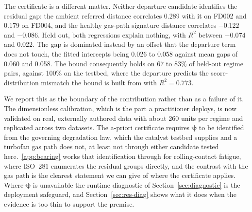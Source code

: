 The certificate is a different matter. Neither departure candidate identifies the residual gap: the
ambient referred distance correlates 0.289 with it on FD002 and 0.179 on FD004, and the healthy
gas-path signature distance correlates $-0.122$ and $-0.086$. Held out, both regressions explain
nothing, with $R^2$ between $-0.074$ and 0.022. The gap is dominated instead by an offset that the
departure term does not touch, the fitted intercepts being 0.026 to 0.058 against mean gaps of 0.060
and 0.058. The bound consequently holds on 67 to 83\% of held-out regime pairs, against 100\% on the
testbed, where the departure predicts the score-distribution mismatch the bound is built from with
$R^2=0.773$.

We report this as the boundary of the contribution rather than as a failure of it. The dimensionless
calibration, which is the part a practitioner deploys, is now validated on real, externally authored
data with about 260 units per regime and replicated across two datasets. The a-priori certificate
requires $\boldsymbol\psi$ to be identified from the governing degradation law, which the catalyst
testbed supplies and a turbofan gas path does not, at least not through either candidate tested
here.~\ref{app:bearing} works that identification through for rolling-contact fatigue, where
ISO~281 enumerates the residual groups directly, and the contrast with the gas path is the clearest
statement we can give of where the certificate applies. Where $\boldsymbol\psi$ is unavailable the
runtime diagnostic of Section~\ref{sec:diagnostic} is the deployment safeguard, and
Section~\ref{sec:res-diag} shows what it does when the evidence is too thin to support the
premise.

